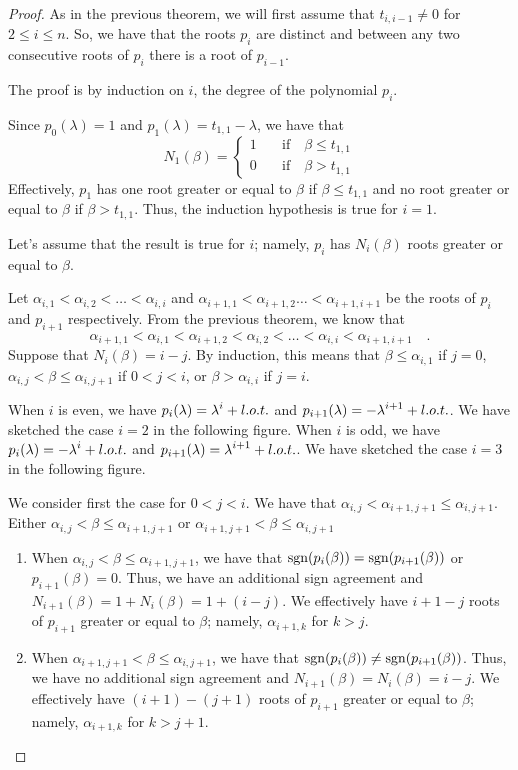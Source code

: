 \begin{proof}
As in the previous theorem, we will first assume that
$t_{i,i-1} \neq 0$ for $2\leq i \leq n$.  So, we have that the roots
$p_i$ are distinct and between any two consecutive roots of $p_i$
there is a root of $p_{i-1}$.

The proof is by induction on $i$, the degree of the polynomial $p_i$.

Since $p_0(\lambda) = 1$ and $p_1(\lambda) = t_{1,1}-\lambda$, we have
that
\[
N_1(\beta) = \begin{cases}
1 & \quad \text{if} \quad \beta \leq t_{1,1} \\
0 & \quad \text{if} \quad \beta > t_{1,1}    
\end{cases}
\]
Effectively, $p_1$ has one root greater or equal to $\beta$ if
$\beta \leq t_{1,1}$ and no root greater or equal to $\beta$ if
$\beta > t_{1,1}$.  Thus, the induction hypothesis is true for $i=1$.

Let's assume that the result is true for $i$; namely, $p_i$ has
$N_i(\beta)$ roots greater or equal to $\beta$.

Let $\alpha_{i,1} < \alpha_{i,2} < \ldots < \alpha_{i,i}$ and
$\alpha_{i+1,1} < \alpha_{i+1,2} \ldots < \alpha_{i+1,i+1}$ be the
roots of $p_i$ and $p_{i+1}$ respectively.  From the previous theorem,
we know that
\[
  \alpha_{i+1,1} < \alpha_{i,1} < \alpha_{i+1,2} < \alpha_{i,2} < \ldots
  < \alpha_{i,i} < \alpha_{i+1,i+1}  \quad .
\]
Suppose that $N_i(\beta) = i-j$.  By induction, this means that
$\beta \leq \alpha_{i,1}$ if $j=0$,
$\alpha_{i,j} < \beta \leq \alpha_{i,j+1}$ if $0 < j < i$,
or $\beta > \alpha_{i,i}$ if $j=i$.

When $i$ is even, we have $\displaystyle p_i(\lambda) = \lambda^i + l.o.t.$ and
$\displaystyle p_{i+1}(\lambda) = -\lambda^{i+1} + l.o.t.$.  We have sketched
the case $i=2$ in the following figure.
When $i$ is odd, we have $\displaystyle p_i(\lambda) = -\lambda^i + l.o.t.$ and
$\displaystyle p_{i+1}(\lambda) = \lambda^{i+1} + l.o.t.$.  We have sketched
the case $i=3$ in the following figure.

We consider first the case for $0 < j < i$.  We have that
$\alpha_{i,j} < \alpha_{i+1,j+1} \leq \alpha_{i,j+1}$.
Either $\alpha_{i,j} < \beta \leq \alpha_{i+1,j+1}$
or $\alpha_{i+1,j+1} < \beta \leq \alpha_{i,j+1}$

\begin{enumerate}
\item When $\alpha_{i,j} < \beta \leq \alpha_{i+1,j+1}$, we have that
$\operatorname{sgn}(p_i(\beta))=\operatorname{sgn}(p_{i+1}(\beta))$ or $p_{i+1}(\beta) = 0$.
Thus, we have an additional sign agreement and
$N_{i+1}(\beta) = 1 + N_i(\beta) = 1 + (i-j)$.
We effectively have $i+1-j$ roots of $p_{i+1}$ greater or equal to
$\beta$; namely, $\alpha_{i+1,k}$ for $k>j$.
\item When $\alpha_{i+1,j+1} < \beta \leq \alpha_{i,j+1}$, we have that
$\operatorname{sgn}(p_i(\beta)) \neq \operatorname{sgn}(p_{i+1}(\beta))$.
Thus, we have no additional sign agreement and
$N_{i+1}(\beta) =  N_i(\beta) = i-j$.  We effectively have
$(i+1)-(j+1)$ roots of $p_{i+1}$ greater or equal to $\beta$; namely,
$\alpha_{i+1,k}$ for $k>j+1$.
\end{enumerate}


\end{proof}
